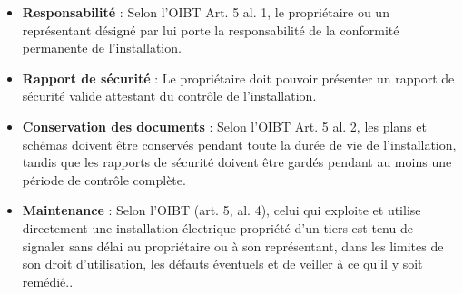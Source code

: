 \documentclass[a4paper,11pt,answers,addpoints]{exam}
\begin{document}
\begin{questions}
\begin{solution}
\begin{itemize}
	\item \textbf{Responsabilité} : Selon l'OIBT Art. 5 al. 1, le propriétaire ou un représentant désigné par lui porte la responsabilité de la conformité permanente de l'installation.
	\item \textbf{Rapport de sécurité} : Le propriétaire doit pouvoir présenter un rapport de sécurité valide attestant du contrôle de l'installation.
	\item \textbf{Conservation des documents} : Selon l'OIBT Art. 5 al. 2, les plans et schémas doivent être conservés pendant toute la durée de vie de l'installation, tandis que les rapports de sécurité doivent être gardés pendant au moins une période de contrôle complète.
	\item \textbf{Maintenance} : Selon l’OIBT (art. 5, al. 4), celui qui exploite et utilise directement une installation électrique propriété d’un tiers est tenu de signaler sans délai au propriétaire ou à son représentant, dans les limites de son droit d’utilisation, les défauts éventuels et de veiller à ce qu’il y soit remédié..
\end{itemize}
\end{solution}
\end{questions}
\end{document}

